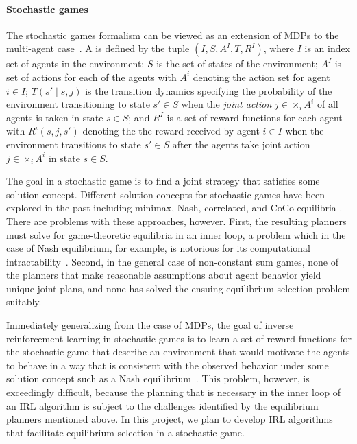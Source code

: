 
\vspace{\up}
\paragraph{Stochastic games}

The stochastic games formalism can be viewed as an extension of MDPs
to the multi-agent case~\cite{littman1994markov}. 
A  is defined by the tuple $(I, S, A^I, T,
R^I)$, where $I$ is an index set of agents in the environment; $S$ is
the set of states of the environment; $A^I$ is set of actions for each
of the agents with $A^i$ denoting the action set for agent $i \in I$;
$T(s' \mid s, j)$ is the transition dynamics specifying the
probability of the environment transitioning to state $s' \in S$ when
the {\em joint action} $j \in \times_i A^i$ of all agents is taken in
state $s \in S$; and $R^I$ is a set of reward functions for each agent
with $R^i(s, j, s')$ denoting the the reward received by agent
$i \in I$ when the environment transitions to state $s' \in S$ after
the agents take joint action $j \in \times_i A^i$ in state $s \in S$.

The goal in a stochastic game is to find a joint strategy that
satisfies some solution concept. Different solution concepts for
stochastic games have been explored in the past including minimax,
Nash, correlated, and CoCo equilibria
\cite{GreenwaldHall:03,HuWellman03,Littman01,ZGL:06}. There are
problems with these approaches, however. First, the resulting planners
must solve for game-theoretic equilibria in an inner loop, a problem
which in the case of Nash equilibrium, for example, is notorious for
its computational
intractability~\cite{daskalakis2009complexity}. Second, in the general
case of non-constant sum games, none of the planners that make
reasonable assumptions about agent behavior yield unique joint plans,
and none has solved the ensuing equilibrium selection problem
suitably.

Immediately generalizing from the case of MDPs, the goal of inverse
reinforcement learning in stochastic games is to learn a set of reward
functions for the stochastic game that describe an environment that
would motivate the agents to behave in a way that is consistent with
the observed behavior under some solution concept such as a Nash
equilibrium~\cite{reddy2012inverse}.  This problem, however, is
exceedingly difficult, because the planning that is necessary in the
inner loop of an IRL algorithm is subject to the challenges identified
by the equilibrium planners mentioned above.
%
In this project, we plan to develop IRL algorithms that facilitate
equilibrium selection in a stochastic game.  

